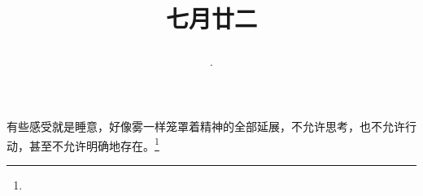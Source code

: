 \title{\date[d=25,m=8,y=2024][year:cn-y,年,month:cn,day:cn,日,·,weekday]·七月廿二 }
有些感受就是睡意，好像雾一样笼罩着精神的全部延展，不允许思考，也不允许行动，甚至不允许明确地存在。\footnote{ }

